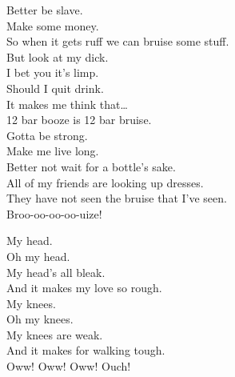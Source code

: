 


Better be slave. \\
Make some money. \\
So when it gets ruff we can bruise some stuff. \\

But look at my dick. \\
I bet you it's limp. \\
Should I quit drink. \\
It makes me think that… \\

12 bar booze is 12 bar bruise. \\

Gotta be strong. \\
Make me live long. \\
Better not wait for a bottle's sake. \\

All of my friends are looking up dresses. \\
They have not seen the bruise that I've seen. \\
Broo-oo-oo-oo-uize! \\




My head. \\
Oh my head. \\
My head's all bleak. \\
And it makes my love so rough. \\

My knees. \\
Oh my knees. \\
My knees are weak. \\
And it makes for walking tough. \\

Oww! Oww! Oww! Ouch! \\





